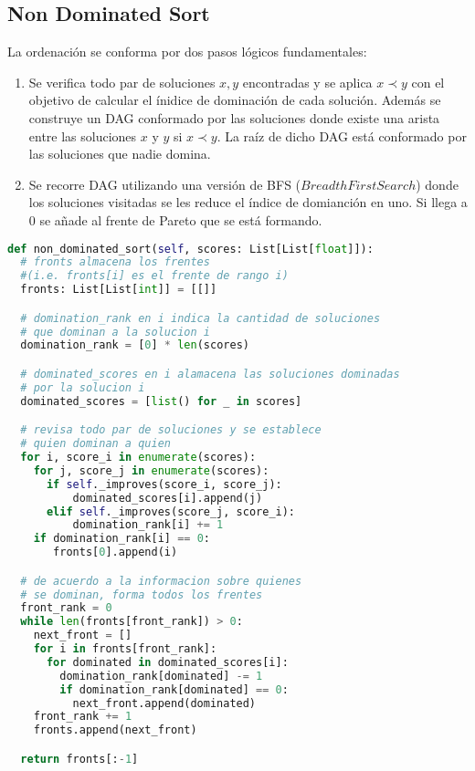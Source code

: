 \subsection{Non Dominated Sort}
La ordenaci\'on se conforma por dos pasos l\'ogicos fundamentales:
\begin{enumerate}
    \item Se verifica todo par de soluciones $x, y$ encontradas y se aplica $x \prec y$ con el objetivo de calcular el \'inidice de dominaci\'on de cada soluci\'on. Adem\'as se construye un DAG conformado por las soluciones donde existe una arista entre las soluciones $x$ y $y$ si $x \prec y$. La ra\'iz de dicho DAG est\'a conformado por las soluciones que nadie domina.
    \item Se recorre DAG utilizando una versi\'on de BFS ($Breadth First Search$) donde los soluciones visitadas se les reduce el \'indice de domianci\'on en uno. Si llega a 0 se a\~nade al frente de Pareto que se est\'a formando.
\end{enumerate}

\begin{lstlisting}[language=Python]
def non_dominated_sort(self, scores: List[List[float]]):
  # fronts almacena los frentes 
  #(i.e. fronts[i] es el frente de rango i)
  fronts: List[List[int]] = [[]]

  # domination_rank en i indica la cantidad de soluciones
  # que dominan a la solucion i
  domination_rank = [0] * len(scores)

  # dominated_scores en i alamacena las soluciones dominadas
  # por la solucion i
  dominated_scores = [list() for _ in scores]

  # revisa todo par de soluciones y se establece
  # quien dominan a quien
  for i, score_i in enumerate(scores):
    for j, score_j in enumerate(scores):
      if self._improves(score_i, score_j):
          dominated_scores[i].append(j)
      elif self._improves(score_j, score_i):
          domination_rank[i] += 1
    if domination_rank[i] == 0:
       fronts[0].append(i)

  # de acuerdo a la informacion sobre quienes
  # se dominan, forma todos los frentes
  front_rank = 0
  while len(fronts[front_rank]) > 0:
    next_front = []
    for i in fronts[front_rank]:
      for dominated in dominated_scores[i]:
        domination_rank[dominated] -= 1
        if domination_rank[dominated] == 0:
          next_front.append(dominated)
    front_rank += 1
    fronts.append(next_front)

  return fronts[:-1]
\end{lstlisting}

